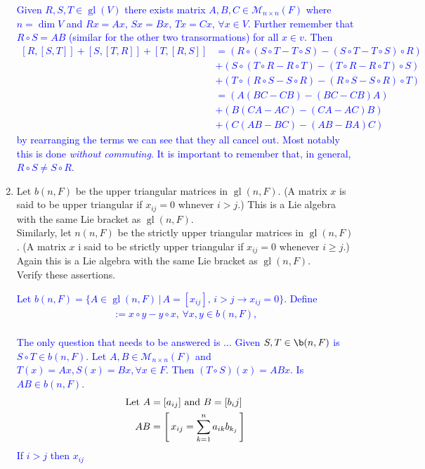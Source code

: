 \documentclass[12pt,a4paper]{report}
\newcommand{\BLUE}[1]{\textcolor{blue}{#1}}
\newcommand{\GL}{\operatorname{gl}}
\newcommand{\LB}[2]{\left [ #1,#2 \right ]}
\begin{document}
\begin{enumerate}[label=\textit{1.\arabic*}]
\newcommand{\GLLB}[2]{(#1\circ #2-#2\circ #1)}

\BLUE{Given $R,S,T \in \GL(V)$ there exists matrix $A,B,C \in \mathcal{M}_{n\times n}(F)$ where $n = \dim V$ and $Rx = Ax,\, Sx = Bx, \, Tx = Cx, \, \forall x \in V$.  Further remember that $R \circ S = AB$ (similar for the other two transormations) for all $x \in v$.  Then
\begin{align*}
	\LB{R}{\LB{S}{T}} + \LB{S}{\LB{T}{R}}+\LB{T}{\LB{R}{S}} &= \GLLB{R}{\GLLB{S}{T}} \\&+ \GLLB{S}{\GLLB{T}{R}}\\&+\GLLB{T}{\GLLB{R}{S}} \\
	&= (A(BC-CB)-(BC-CB)A)\\&+(B(CA-AC)-(CA-AC)B)\\&+(C(AB-BC)-(AB-BA)C)
\end{align*}by rearranging the terms we can see that they all cancel out.  Most notably this is done \textit{without commuting}.  It is important to remember that, in general, $R\circ S \ne S \circ R$.
}

\item Let $b(n,F)$ be the upper triangular matrices in $\GL(n, F)$.  (A matrix $x$ is said to be upper triangular if $x_{ij}=0$ whnever $i> j$.)  This is a Lie algebra with the same Lie bracket as $\GL(n,F)$.\\

Similarly, let $n(n,F)$ be the strictly upper triangular matrices in $\GL(n,F)$.  (A matrix $x$ i said to be strictly upper triangular if $x_{ij}=0$ whenever $i \ge j$.)  Again this is a Lie algebra with the same Lie bracket as $\GL(n,F)$.\\

Verify these assertions.

\BLUE{Let $b(n,F) = \{A \in \GL(n,F)\,|\, A=[x_{ij}],\,i>j \to x_{ij}=0\}$. Define \begin{align*}
	[x,y] := x \circ y -y \circ x,\, \forall x,y \in b(n,F),
\end{align*}\\
The only question that needs to be answered is ... Given $S, T \in \b(n,F)$ is $S\circ T \in b(n,F)$.  Let $A,B \in \mathcal{M}_{n\times n}(F)$ and $T(x) = Ax, S(x)=Bx, \forall x \in F$.  Then $(T\circ S)(x) = ABx$.  Is $AB \in b(n,F)$.
\begin{align*}
	\text{Let } A &= [a_{ij}]\text{ and } B= [b_ij]\\
	AB &= \left [\, x_{ij} = \sum_{k=1}^n  a_{ik}b_{k_j} \,\right ]
\end{align*}If $i>j$ then $x_{ij}$
}


\end{enumerate}
\end{document}
